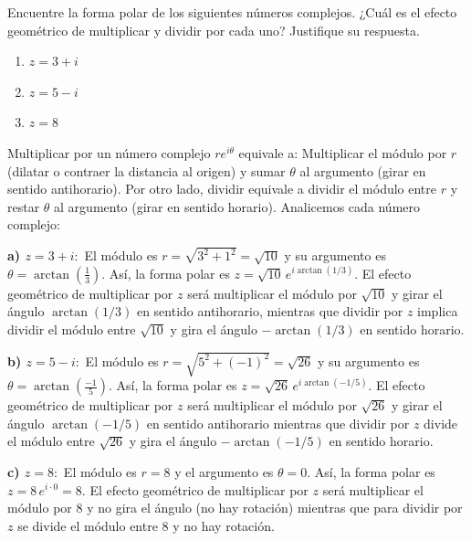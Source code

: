 \begin{prob} 
Encuentre la forma polar de los siguientes números complejos. ¿Cuál es el efecto geométrico de multiplicar y dividir por cada uno? Justifique su respuesta.
\begin{multicols}{3}
\begin{enumerate}[$a)$]
\item $z=3+i$
\item $z=5-i$
\item $z=8$
\end{enumerate}
\end{multicols}
\begin{myproof} Multiplicar por un número complejo $re^{i\theta}$ equivale a: Multiplicar el módulo por $r$ (dilatar o contraer la distancia al origen) y sumar $\theta$ al argumento (girar en sentido antihorario). Por otro lado, dividir equivale a dividir el módulo entre $r$ y restar $\theta$ al argumento (girar en sentido horario). Analicemos cada número complejo:

\textbf{a) $z = 3 + i:$} El módulo es $r = \sqrt{3^2 + 1^2} = \sqrt{10}$ y su argumento es $\theta = \arctan\left(\frac{1}{3}\right)$.  Así, la forma polar es \(
  z = \sqrt{10} \, e^{i\arctan(1/3)}. \) El efecto geométrico de multiplicar por $z$ será multiplicar el módulo por $\sqrt{10}$ y girar el ángulo $\arctan(1/3)$ en sentido antihorario, mientras que dividir por $z$ implica dividir el módulo entre $\sqrt{10}$ y gira el ángulo $-\arctan(1/3)$ en sentido horario.

\textbf{b) $z = 5 - i:$} El módulo es $r = \sqrt{5^2 + (-1)^2} = \sqrt{26}$ y su  argumento es $\theta = \arctan\left(\frac{-1}{5}\right)$. Así, la forma polar es \(
  z = \sqrt{26} \, e^{i\arctan(-1/5)}.\) El efecto geométrico de multiplicar por $z$ será multiplicar el módulo por $\sqrt{26}$ y girar el ángulo $\arctan(-1/5)$ en sentido antihorario mientras que dividir por $z$ divide el módulo entre $\sqrt{26}$ y gira el ángulo $-\arctan(-1/5)$ en sentido horario.

\textbf{c) $z = 8:$} El módulo es $r = 8$ y el argumento es $\theta = 0$. Así, la forma polar es \(z = 8\, e^{i\cdot 0} = 8.\) El efecto geométrico de multiplicar por $z$ será multiplicar el módulo por $8$ y no gira el ángulo (no hay rotación) mientras que para dividir por $z$ se divide el módulo entre $8$ y no hay rotación.

\end{myproof}

\end{prob}

